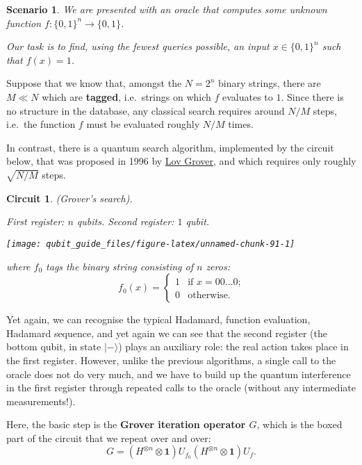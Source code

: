 \documentclass[fleqn]{article}
\newtheorem*{scenario}{Scenario}
\newtheorem*{circuit}{Circuit}
\begin{document}
\begin{scenario}
We are presented with an oracle that computes some unknown function \(f\colon\{0,1\}^n\to\{0,1\}\).

Our task is to find, using the fewest queries possible, an input \(x\in\{0,1\}^n\) such that \(f(x)=1\).

\end{scenario}

Suppose that we know that, amongst the \(N=2^n\) binary strings, there are \(M\ll N\) which are \textbf{tagged}, i.e.~strings on which \(f\) evaluates to \(1\).
Since there is no structure in the database, any classical search requires around \(N/M\) steps, i.e.~the function \(f\) must be evaluated roughly \(N/M\) times.

In contrast, there is a quantum search algorithm, implemented by the circuit below, that was proposed in 1996 by \href{https://en.wikipedia.org/wiki/Lov_Grover}{Lov Grover}, and which requires only roughly \(\sqrt{N/M}\) steps.

\begin{circuit}

(Grover's search).

\emph{First register: \(n\) qubits. Second register: \(1\) qubit.}

\begin{center}\texttt{[image: qubit\_guide\_files/figure-latex/unnamed-chunk-91-1]} \end{center}

where \(f_0\) tags the binary string consisting of \(n\) zeros:
\[
  f_0(x)
  = \begin{cases}
    1 &\text{if $x=00\ldots0$;}
  \\0 &\text{otherwise.}
  \end{cases}
\]

\end{circuit}

Yet again, we can recognise the typical Hadamard, function evaluation, Hadamard sequence, and yet again we can see that the second register (the bottom qubit, in state \(|-\rangle\)) plays an auxiliary role: the real action takes place in the first register.
However, unlike the previous algorithms, a single call to the oracle does not do very much, and we have to build up the quantum interference in the first register through repeated calls to the oracle (without any intermediate measurements!).

Here, the basic step is the \textbf{Grover iteration operator \(G\)}, which is the boxed part of the circuit that we repeat over and over:
\[
  G = (H^{\otimes n}\otimes\mathbf{1}) U_{f_0}(H^{\otimes n}\otimes\mathbf{1}) U_f.
\]
\end{document}

